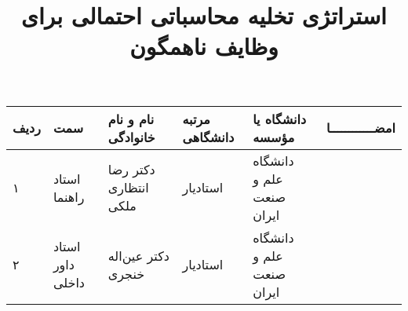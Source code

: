 \subject{مهندسی کامپیوتر}
\title{استراتژی تخلیه محاسباتی احتمالی برای وظایف ناهمگون}


\firstPage
\besmPage
\davaranPage

\begin{center}
\begin{tabular}{| p{8mm} | p{18mm} | p{} |p{14mm}|p{}|c|}
\hline
ردیف	& سمت & نام و نام خانوادگی & مرتبه \newline دانشگاهی &	دانشگاه یا مؤسسه & امضــــــــــــا\\
\hline
۱  & استاد راهنما & دکتر \newline رضا انتظاری ملکی 
& استادیار & دانشگاه \newline علم و صنعت ایران &  \\
\hline
۲ & استاد داور \newline داخلی	 & دکتر \newline عین‌اله خنجری  & استادیار & 
دانشگاه  \newline علم ‌و صنعت ایران & \\
\hline

\end{tabular}
\end{center}

